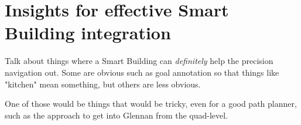 \section{Insights for effective Smart Building integration}

Talk about things where a Smart Building can \emph{definitely} help the precision navigation out. Some are obvious such as goal annotation so that things like "kitchen" mean something, but others are less obvious.

One of those would be things that would be tricky, even for a good path planner, such as the approach to get into Glennan from the quad-level.
